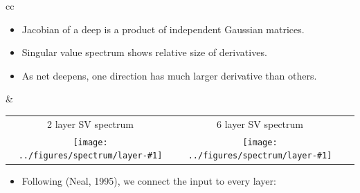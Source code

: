\documentclass[portrait,a0b,final,a4resizeable]{include/a0poster}
\def\jointspacing{\vspace{0.3in}}
\begin{document}
\begin{poster}
\begin{multicols}{2}
\jointspacing







\newcommand{\spectrumpic}[1]{
\texttt{[image: ../figures/spectrum/layer-\#1]}} 


\begin{tabular}{cc}
\begin{minipage}[c]{0.45\columnwidth}


\begin{itemize}
\item Jacobian of a deep \gp{} is a product of independent Gaussian matrices.%
\item Singular value spectrum shows relative size of derivatives.
\item As net deepens, one direction has much larger derivative than others.
\end{itemize}


\end{minipage}
&
\begin{minipage}[cc]{0.55\columnwidth}
\begin{centering}
\begin{tabular}{ccc}
2 layer SV spectrum & 6 layer SV spectrum \\
\hspace{-0.16in} \spectrumpic{2} &
\hspace{-0.16in} \spectrumpic{6} 
\end{tabular}
\end{centering}
\end{minipage}
\end{tabular}



\centering
\begin{itemize}
	\item 
	Following {\color{mydarkblue} (Neal, 1995)}, we connect the input to every layer:
\end{itemize}



\end{multicols}
\end{poster}
\end{document}

